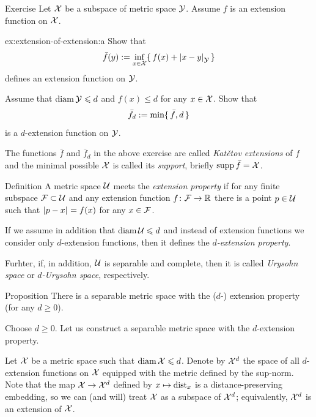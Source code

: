 \begin{thm}{Exercise}\label{ex:extension-of-extension}
Let $\mathcal{X}$ be a subspace of metric space $\mathcal{Y}$.
Assume $f$ is an extension function on $\mathcal{X}$.

\begin{subthm}{ex:extension-of-extension:a}
Show that 
\[\bar f(y)
\df
\inf_{x\in \spc{X}} \{\,f(x)+\dist{x}{y}{\spc{Y}}\,\}\]
defines an extension function on $\mathcal{Y}$.
\end{subthm}

\begin{subthm}{}
Assume that $\operatorname{\rm diam}\nolimits \mathcal{Y}\leqslant d$ and $f(x)\le d$ for any $x\in  \mathcal{X}$.
Show that 
\[\bar f_d
\mathrel{:=}
\min \{\, \bar f,d\,\}\]
is a $d$-extension function on $\mathcal{Y}$.
\end{subthm}

\end{thm}

The functions $\bar f$ and $\bar f_d$ in the above exercise are called \emph{Katětov extensions} of $f$ and the minimal possible $\mathcal{X}$ is called its \emph{support}, briefly \index{$\supp$}$\operatorname{\rm supp}\nolimits \bar f=\mathcal{X}$.

\begin{thm}{Definition}\label{def:finite+1}
A metric space $\mathcal{U}$ meets the \emph{extension property}  if for any finite subspace $\mathcal{F}\subset\mathcal{U}$ and any extension function $f\colon\mathcal{F}\to\mathbb{R}$ there is a point $p\in \mathcal{U}$ such that $\dist{p}{x}{}=f(x)$ for any $x\in \mathcal{F}$.

If we assume in addition that $\operatorname{\rm diam}\nolimits \mathcal{U}\leqslant d$ and instead of extension functions we consider only $d$-extension functions, then it defines the {}\emph{$d$-extension property}.

Furhter, if, in addition, $\mathcal{U}$ is separable and complete, then it is called \emph{Urysohn space} or {}\emph{$d$-Urysohn space}, respectively.
\end{thm}


\begin{thm}{Proposition}\label{prop:univeral-separable}
There is a separable metric space with the ($d$-) extension property (for any $d\ge 0$).
\end{thm}

Choose $d\ge 0$.
Let us construct a separable metric space with  the $d$-extension property.

Let $\mathcal{X}$ be a metric space such that $\operatorname{\rm diam}\nolimits\mathcal{X}\leqslant d$.
Denote by $\mathcal{X}^d$ the space of all $d$-extension functions on $\mathcal{X}$ equipped with the metric defined by the sup-norm.
Note that the map $\mathcal{X} \to \mathcal{X}^d$ defined by $x\mapsto\mathrm{dist}_x$ is a distance-preserving embedding,
so we can (and will) treat $\mathcal{X}$ as a subspace of $\mathcal{X}^d$; equivalently, $\mathcal{X}^d$ is an extension of $\mathcal{X}$.

